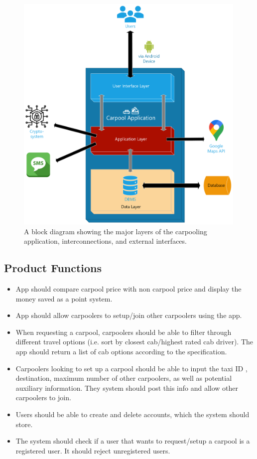 \documentclass[]{article}
\begin{document}
\begin{figure}[h!]
	\centering
	\includegraphics[width=30em]{ProductPerspectiveBlockDiagram.png}
	\caption{A block diagram showing the major layers of the carpooling application, interconnections, and external interfaces.}
	\label{fig:blockdiagram}
\end{figure}

\subsection{Product Functions}
\label{sub:product_functions}
\begin{itemize}
	\item App should compare carpool price with non carpool price and display the money saved as a point system.
	\item App should allow carpoolers to setup/join other carpoolers using the app.
	\item When requesting a carpool, carpoolers should be able to filter through different travel options (i.e. sort by closest cab/highest rated cab driver). The app should return a list of cab options according to the specification.
	\item Carpoolers looking to set up a carpool should be able to input the taxi ID , destination, maximum number of other carpoolers,  as well as potential auxiliary information. They system should post this info and allow other carpoolers to join.
	\item Users should be able to create and delete accounts, which the system should store.
	\item The system should check if a user that wants to request/setup a carpool is a registered user. It should reject unregistered users.
\end{itemize}
\end{document}
